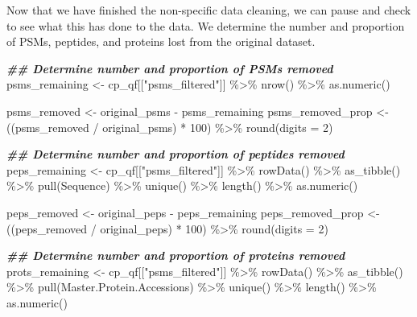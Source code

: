 \documentclass[9pt,a4paper,]{extarticle}
\newenvironment{Shaded}{\begin{snugshade}}{\end{snugshade}}
\newcommand{\AttributeTok}[1]{\textcolor[rgb]{0.77,0.63,0.00}{#1}}
\newcommand{\DecValTok}[1]{\textcolor[rgb]{0.00,0.00,0.81}{#1}}
\newcommand{\DocumentationTok}[1]{\textcolor[rgb]{0.56,0.35,0.01}{\textbf{\textit{#1}}}}
\newcommand{\FunctionTok}[1]{\textcolor[rgb]{0.00,0.00,0.00}{#1}}
\newcommand{\NormalTok}[1]{#1}
\newcommand{\OtherTok}[1]{\textcolor[rgb]{0.56,0.35,0.01}{#1}}
\newcommand{\SpecialCharTok}[1]{\textcolor[rgb]{0.00,0.00,0.00}{#1}}
\newcommand{\StringTok}[1]{\textcolor[rgb]{0.31,0.60,0.02}{#1}}
\begin{document}
Now that we have finished the non-specific data cleaning, we can pause and check
to see what this has done to the data. We determine the number and proportion of
PSMs, peptides, and proteins lost from the original dataset.

\begin{Shaded}
\begin{Highlighting}[]
\DocumentationTok{\#\# Determine number and proportion of PSMs removed}
\NormalTok{psms\_remaining }\OtherTok{\textless{}{-}}\NormalTok{ cp\_qf[[}\StringTok{"psms\_filtered"}\NormalTok{]] }\SpecialCharTok{\%\textgreater{}\%}
  \FunctionTok{nrow}\NormalTok{() }\SpecialCharTok{\%\textgreater{}\%}
  \FunctionTok{as.numeric}\NormalTok{()}

\NormalTok{psms\_removed }\OtherTok{\textless{}{-}}\NormalTok{ original\_psms }\SpecialCharTok{{-}}\NormalTok{ psms\_remaining}
\NormalTok{psms\_removed\_prop }\OtherTok{\textless{}{-}}\NormalTok{ ((psms\_removed }\SpecialCharTok{/}\NormalTok{ original\_psms) }\SpecialCharTok{*} \DecValTok{100}\NormalTok{) }\SpecialCharTok{\%\textgreater{}\%}
  \FunctionTok{round}\NormalTok{(}\AttributeTok{digits =} \DecValTok{2}\NormalTok{)}

\DocumentationTok{\#\# Determine number and proportion of peptides removed}
\NormalTok{peps\_remaining }\OtherTok{\textless{}{-}}\NormalTok{ cp\_qf[[}\StringTok{"psms\_filtered"}\NormalTok{]] }\SpecialCharTok{\%\textgreater{}\%}
  \FunctionTok{rowData}\NormalTok{() }\SpecialCharTok{\%\textgreater{}\%} 
  \FunctionTok{as\_tibble}\NormalTok{() }\SpecialCharTok{\%\textgreater{}\%} 
  \FunctionTok{pull}\NormalTok{(Sequence) }\SpecialCharTok{\%\textgreater{}\%} 
  \FunctionTok{unique}\NormalTok{() }\SpecialCharTok{\%\textgreater{}\%}
  \FunctionTok{length}\NormalTok{() }\SpecialCharTok{\%\textgreater{}\%}
  \FunctionTok{as.numeric}\NormalTok{()}

\NormalTok{peps\_removed }\OtherTok{\textless{}{-}}\NormalTok{ original\_peps }\SpecialCharTok{{-}}\NormalTok{ peps\_remaining}
\NormalTok{peps\_removed\_prop }\OtherTok{\textless{}{-}}\NormalTok{ ((peps\_removed }\SpecialCharTok{/}\NormalTok{ original\_peps) }\SpecialCharTok{*} \DecValTok{100}\NormalTok{) }\SpecialCharTok{\%\textgreater{}\%}
  \FunctionTok{round}\NormalTok{(}\AttributeTok{digits =} \DecValTok{2}\NormalTok{)}

\DocumentationTok{\#\# Determine number and proportion of proteins removed}
\NormalTok{prots\_remaining }\OtherTok{\textless{}{-}}\NormalTok{ cp\_qf[[}\StringTok{"psms\_filtered"}\NormalTok{]] }\SpecialCharTok{\%\textgreater{}\%} 
  \FunctionTok{rowData}\NormalTok{() }\SpecialCharTok{\%\textgreater{}\%} 
  \FunctionTok{as\_tibble}\NormalTok{() }\SpecialCharTok{\%\textgreater{}\%} 
  \FunctionTok{pull}\NormalTok{(Master.Protein.Accessions) }\SpecialCharTok{\%\textgreater{}\%} 
  \FunctionTok{unique}\NormalTok{() }\SpecialCharTok{\%\textgreater{}\%}
  \FunctionTok{length}\NormalTok{() }\SpecialCharTok{\%\textgreater{}\%}
  \FunctionTok{as.numeric}\NormalTok{() }


\end{Highlighting}
\end{Shaded}
\end{document}
